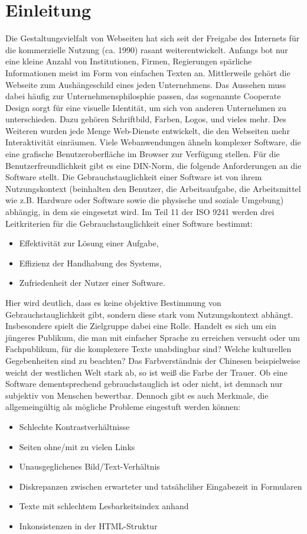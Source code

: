 \documentclass[runningheads,a4paper]{llncs}
\begin{document}
\section{Einleitung}
Die Gestaltungsvielfalt von Webseiten hat sich seit der Freigabe des Internets für die kommerzielle Nutzung (ca. 1990) rasant weiterentwickelt. 
Anfangs bot nur eine kleine Anzahl von Institutionen, Firmen, Regierungen spärliche Informationen meist im Form von einfachen Texten an. 
Mittlerweile gehört die Webseite zum Aushängeschild eines jeden Unternehmens. 
Das Aussehen muss dabei häufig zur Unternehmensphilosphie passen, das sogenannte Cooperate Design sorgt für eine visuelle Identität, um sich von anderen Unternehmen zu unterschieden. 
Dazu gehören Schriftbild, Farben, Logos, und vieles mehr.
Des Weiteren wurden jede Menge Web-Dienste entwickelt, die den Webseiten mehr Interaktivität einräumen. 
Viele Webanwendungen ähneln komplexer Software, die eine grafische Benutzeroberfläche im Browser zur Verfügung stellen.
Für die Benutzerfreundlichkeit gibt es eine DIN-Norm, die folgende Anforderungen an die Software stellt.
Die Gebrauchstauglichkeit einer Software ist von ihrem Nutzungskontext (beinhalten den Benutzer, die Arbeitsaufgabe, die Arbeitsmittel wie z.B. Hardware oder Software sowie die physische und soziale Umgebung) abhängig, in dem sie eingesetzt wird. 
Im Teil 11 der ISO 9241 werden drei Leitkriterien für die Gebrauchstauglichkeit einer Software bestimmt:
\begin{itemize}
\item{Effektivität zur Lösung einer Aufgabe,}
\item{Effizienz der Handhabung des Systems,}
\item{Zufriedenheit der Nutzer einer Software.}
\end{itemize}
Hier wird deutlich, dass es keine objektive Bestimmung von Gebrauchstauglichkeit gibt, sondern diese stark vom Nutzungskontext abhängt. 
Insbesondere spielt die Zielgruppe dabei eine Rolle. 
Handelt es sich um ein jüngeres Publikum, die man mit einfacher Sprache zu erreichen versucht oder um Fachpublikum, für die komplexere Texte unabdingbar sind?
Welche kulturellen Gegebenheiten sind zu beachten? 
Das Farbverständnis der Chinesen beispielweise weicht der westlichen Welt stark ab, so ist weiß die Farbe der Trauer.
Ob eine Software dementsprechend gebrauchstauglich ist oder nicht, ist demnach nur subjektiv von Menschen bewertbar.
Dennoch gibt es auch Merkmale, die allgemeingültig als mögliche Probleme eingestuft werden können:
\begin{itemize}
\item{Schlechte Kontrastverhältnisse}
\item{Seiten ohne/mit zu vielen Links}
\item{Unausgeglichenes Bild/Text-Verhältnis}
\item{Diskrepanzen zwischen erwarteter und tatsähcliher Eingabezeit in Formularen}
\item{Texte mit schlechtem Lesbarkeitsindex anhand \cite{lesbarkeit}}
\item{Inkonsistenzen in der HTML-Struktur}
\end{itemize}
\end{document}
